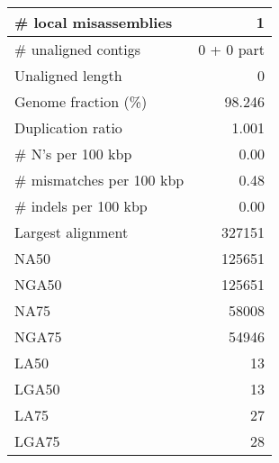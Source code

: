 \documentclass[12pt,a4paper]{article}
\begin{document}
\begin{table}[ht]
\begin{center}
\begin{tabular}{|l*{1}{|r}|}
\# local misassemblies & 1 \\ \hline
\# unaligned contigs & 0 + 0 part \\ \hline
Unaligned length & 0 \\ \hline
Genome fraction (\%) & 98.246 \\ \hline
Duplication ratio & 1.001 \\ \hline
\# N's per 100 kbp & 0.00 \\ \hline
\# mismatches per 100 kbp & 0.48 \\ \hline
\# indels per 100 kbp & 0.00 \\ \hline
Largest alignment & 327151 \\ \hline
NA50 & 125651 \\ \hline
NGA50 & 125651 \\ \hline
NA75 & 58008 \\ \hline
NGA75 & 54946 \\ \hline
LA50 & 13 \\ \hline
LGA50 & 13 \\ \hline
LA75 & 27 \\ \hline
LGA75 & 28 \\ \hline
\end{tabular}
\end{center}
\end{table}
\end{document}

